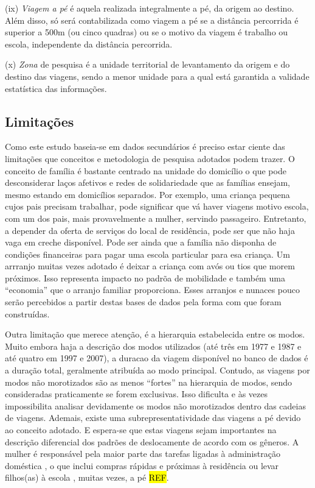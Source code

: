 \begin{compactitem}[]
\item (ix) \emph{Viagem a pé} é aquela realizada integralmente a pé, da origem ao destino. Além disso, só será contabilizada como viagem a pé se a distância percorrida é superior a 500m (ou cinco quadras) ou se o motivo da viagem é trabalho ou escola, independente da distância percorrida.

\item (x) \emph{Zona} de pesquisa é a unidade territorial de levantamento da origem e do destino das viagens, sendo a menor unidade para a qual está garantida a validade estatística das informações.
\end{compactitem}

\subsection{Limitações}\label{subsec:limitacoes}

Como este estudo baseia-se em dados secundários é preciso estar ciente das limitações que conceitos e metodologia de pesquisa adotados podem trazer. O conceito de família é bastante centrado na unidade do domicílio o que pode desconsiderar laços afetivos e redes de solidariedade que as famílias ensejam, mesmo estando em domicílios separados. Por exemplo, uma criança pequena cujos pais precisam trabalhar, pode significar que vá haver viagens motivo escola, com um dos pais, mais provavelmente a mulher, servindo passageiro. Entretanto, a depender da oferta de serviços do local de residência, pode ser que não haja vaga em creche disponível. Pode ser ainda que a família não disponha de  condições financeiras para pagar uma escola particular para esa criança. Um arrranjo muitas vezes adotado é deixar a criança com avós ou tios que morem próximos. Isso representa impacto no padrõa de mobilidade e também uma ``economia'' que o arranjo familiar proporciona. Esses arranjos e nunaces pouco serão percebidos a partir destas bases de dados pela forma com que foram construídas.

Outra limitação que merece atenção, é a hierarquia estabelecida entre os modos. Muito embora haja a descrição dos modos utilizados (até três em 1977 e 1987 e até quatro em 1997 e 2007), a duracao da viagem disponível no banco de dados é a duração total, geralmente atribuída ao modo principal. Contudo, as viagens por modos não morotizados são as menos ``fortes'' na hierarquia de modos, sendo consideradas praticamente se forem exclusivas. Isso dificulta e às vezes impossibilita analisar devidamente os modos não morotizados dentro das cadeias de viagens. 
Ademais, existe uma subrepresentatividade das viagens a pé devido ao conceito adotado. E espera-se que estas viagens sejam importantes na descrição diferencial dos padrões de deslocamente de acordo com os gêneros.  A mulher é responsável pela maior parte das tarefas ligadas à administração doméstica \cite{ROOT1999,VANCE2007}, o que inclui compras rápidas e próximas à residência ou levar filhos(as) à escola \cite{FOX1983,FAGNANI1983,IBIPO1992,MCNUCKIN2005,SCHWANEN2002,SONG2003,CRANE2007}, muitas vezes, a pé \hl{REF}.


